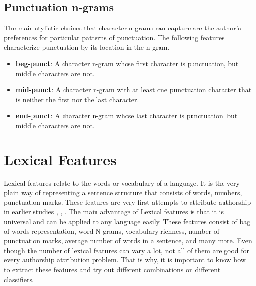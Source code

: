 \subsection{Punctuation n-grams}

The main stylistic choices that character n-grams can capture are the author’s preferences for particular patterns of punctuation. The following features characterize punctuation by its location in the n-gram.

\begin{itemize}
	\item \textbf{beg-punct}: A character n-gram whose first character is punctuation, but middle characters are not.
	\item \textbf{mid-punct}: A character n-gram with at least one punctuation character that is neither the first nor the last character.
	\item \textbf{end-punct}: A character n-gram whose last character is punctuation, but middle characters are not.
\end{itemize}

\section{Lexical Features}

Lexical features relate to the words or vocabulary of a language. It is the very plain way of representing a sentence structure that consists of words, numbers, punctuation marks. These features are very first attempts to attribute authorship in earlier studies \cite{fox2012statistical}, \cite{argamon2005measuring}, \cite{stanko2013whose}. The main advantage of Lexical features is that it is universal and can be applied to any language easily. These features consist of bag of words representation, word N-grams, vocabulary richness, number of punctuation marks, average number of words in a sentence, and many more. Even though the number of lexical features can vary a lot, not all of them are good for every authorship attribution problem. That is why, it is important to know how to extract these features and try out different combinations on different classifiers.

